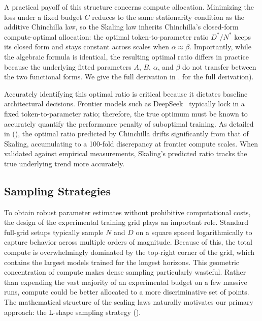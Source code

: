 \documentclass[]{fairmeta}
\newcommand{\ska}{Skaling}
\begin{document}
A practical payoff of this structure concerns compute allocation. Minimizing the loss under a fixed budget $C$ reduces to the same stationarity condition as the additive Chinchilla law, so the \ska{} law inherits Chinchilla's closed-form compute-optimal allocation: the optimal token-to-parameter ratio $D^{*}/N^{*}$ keeps its closed form and stays constant across scales when $\alpha \approx \beta$. Importantly, while the algebraic formula is identical, the resulting optimal ratio differs in practice because the underlying fitted parameters $A$, $B$, $\alpha$, and $\beta$ do not transfer between the two functional forms. We give the full derivation in .  for the full derivation).

Accurately identifying this optimal ratio is critical because it dictates baseline architectural decisions. Frontier models such as DeepSeek~\cite{bi2024deepseek} typically lock in a fixed token-to-parameter ratio; therefore, the true optimum must be known to accurately quantify the performance penalty of suboptimal training. As detailed in  (), the optimal ratio predicted by Chinchilla drifts significantly from that of \ska{}, accumulating to a 100-fold discrepancy at frontier compute scales. When validated against empirical measurements, \ska{}'s predicted ratio tracks the true underlying trend more accurately.

\subsection{Sampling Strategies}
\label{sec:sampling}
To obtain robust parameter estimates without prohibitive computational costs, the design of the experimental training grid plays an important role. Standard full-grid setups typically sample $N$ and $D$ on a square spaced logarithmically to capture behavior across multiple orders of magnitude. Because of this, the total compute is overwhelmingly dominated by the top-right corner of the grid, which contains the largest models trained for the longest horizons. This geometric concentration of compute makes dense sampling particularly wasteful. Rather than expending the vast majority of an experimental budget on a few massive runs, compute could be better allocated to a more discriminative set of points. The mathematical structure of the scaling laws naturally motivates our primary approach: the L-shape sampling strategy ().
\end{document}

